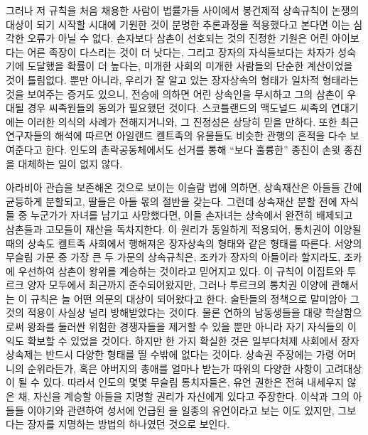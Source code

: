 그러나
저 규칙을 처음 채용한 사람이
법률가들 사이에서
봉건제적 상속규칙이
논쟁의 대상이 되기 시작할 시대에
기원한 것이
분명한 추론과정을
적용했다고 본다면 이는
심각한 오류가 아닐 수 없다.
손자보다 삼촌이 선호되는 것의 진정한 기원은
어린 아이보다는 어른 족장이 다스리는 것이 더 낫다는,
그리고 장자의 자식들보다는
차자가 성숙기에 도달했을 확률이 더 높다는,
미개한 사회의 미개한 사람들의 단순한 계산이었을 것이 틀림없다.
뿐만 아니라,
우리가 잘 알고 있는 장자상속의 형태가 일차적 형태라는 것을 보여주는
증거도 있으니,
전승에 의하면
어린 상속인을 무시하고 그의 삼촌이 우대될 경우
씨족원들의 동의가 필요했던 것이다.
스코틀랜드의 맥도널드 씨족의 연대기에는
이러한 의식의 사례가 전해지거니와,
그 진정성은 상당히 믿을 만하다.
또한 최근 연구자들의 해석에 따르면
아일랜드 켈트족의 유물들도 비슷한 관행의 흔적을 다수 보여준다고 한다.
인도의 촌락공동체에서도
선거를 통해
``보다 훌륭한'' 종친이
손윗 종친을
대체하는 일이 없지 않다.

아라비아 관습을 보존해온 것으로 보이는
이슬람 법에 의하면,
상속재산은 아들들 간에 균등하게 분할되고,
딸들은 아들 몫의 절반을 갖는다.
그런데 상속재산 분할 전에 자식들 중 누군가가 자녀를 남기고 사망했다면,
이들 손자녀는 상속에서 완전히 배제되고 삼촌들과 고모들이 재산을 독차지한다.
이 원리가 동일하게 적용되어,
통치권이 이양될 때의 상속도
켈트족 사회에서 행해져온 장자상속의 형태와
같은 형태를 따른다.
서양의 무슬림 가문 중 가장 큰 두 가문의 상속규칙은,
조카가 장자의 아들이라 할지라도, 조카에 우선하여 삼촌이 왕위를
계승하는 것이라고 믿어지고 있다.
이 규칙이 이집트와 투르크 양자 모두에서
최근까지 준수되어왔지만,
그러나
투르크의 통치권 이양에 관해서는 이 규칙은
늘 어떤 의문의 대상이 되어왔다고 한다.
술탄들의 정책으로 말미암아 그것의 적용이 사실상 널리 방해받았다는 것이다.
물론 연하의 남동생들을 대량 학살함으로써
왕좌를 둘러싼 위험한 경쟁자들을 제거할 수 있을 뿐만 아니라
자기 자식들의 이익도 확보할 수 있었을 것이다.
하지만 한 가지 확실한 것은
일부다처제 사회에서
장자상속제는 반드시 다양한 형태를 띨 수밖에 없다는 것이다.
상속권 주장에는
가령 어머니의 순위라든가, 혹은 아버지의 총애를 얼마나 받는가 따위의
다양한 사항이 고려대상이 될 수 있다.
따라서 인도의 몇몇 무슬림 통치자들은,
유언 권한은 전혀 내세우지 않은 채,
자신을 계승할 아들을 지명할 권리가 자신에게 있다고 주장한다.
이삭과 그의 아들들 이야기와 관련하여 성서에 언급된
을 일종의 유언이라고 보는 이도 있지만,
그보다는 장자를 지명하는 방법의 하나였던 것으로 보인다.

